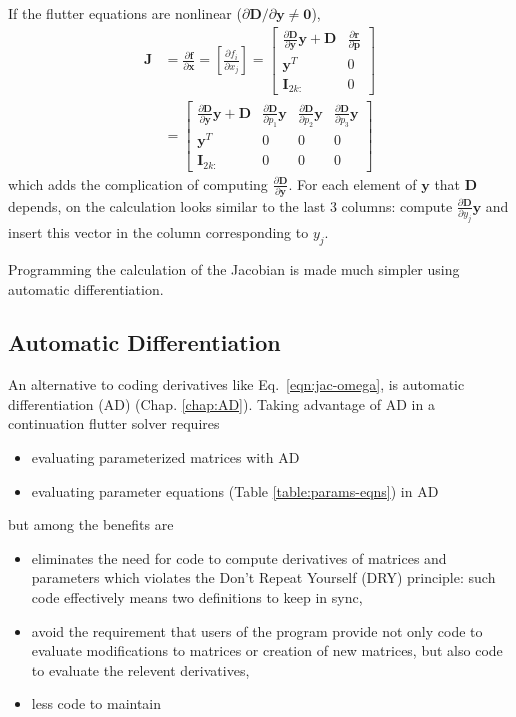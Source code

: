 \documentclass[10pt,openany,twoside]{book}
\numberwithin{equation}{section}   %
\newcommand{\Matrix}[1]{\boldsymbol{#1}}
\newcommand{\Vector}[1]{\boldsymbol{#1}}
\newcommand{\Chapref}[1]{Chap. \ref{#1}}
\newcommand{\Eqn}[1]{Eq.\ \ref{#1}}
\newcommand{\Tableref}[1]{Table \ref{#1}}
\begin{document}
If the flutter equations are nonlinear
($\partial \Matrix{D}/\partial \Vector{y} \ne \Vector{0}$),
\begin{align}
	\Matrix{J} &= \frac{\partial \Vector{f}}{\partial \Vector{x}} =
		\left[\frac{\partial f_i}{\partial x_j}\right]
		= \left[ \begin{array}{cc}
			\frac{\partial \Matrix{D}}{\partial \Vector{y}}\Vector{y}+\Matrix{D}
				& \frac{\partial \Vector{r}}{\partial \Vector{p}} \\
			\Vector{y}^T & 0 \\
			\Matrix{I}_{2k:} & 0
		\end{array}\right]		\nonumber \\
			&= \left[ \begin{array}{cccc}
				\frac{\partial \Matrix{D}}{\partial \Vector{y}}\Vector{y}+\Matrix{D}
					& \frac{\partial \Matrix{D}}{\partial p_1}\Vector{y}
					& \frac{\partial \Matrix{D}}{\partial p_2}\Vector{y}
					& \frac{\partial \Matrix{D}}{\partial p_3}\Vector{y}	\\
				\Vector{y}^T & 0 & 0 & 0	\\
				\Matrix{I}_{2k:} & 0 & 0 & 0
		\end{array}\right]
\end{align}
which adds the complication of computing $\frac{\partial \Matrix{D}}{\partial \Vector{y}}$.
For each element of $\Vector{y}$ that $\Matrix{D}$ depends, on the calculation looks
similar to the last 3 columns: compute $\frac{\partial \Matrix{D}}{\partial y_j}\Vector{y}$
and insert this vector in the column corresponding to $y_j$.

Programming the calculation of the Jacobian is made much simpler using
automatic differentiation.

\subsection{Automatic Differentiation}
An alternative to coding derivatives like \Eqn{eqn:jac-omega}, is
automatic differentiation (AD) (\Chapref{chap:AD}).
Taking advantage of AD in a continuation flutter solver requires
\begin{itemize}
	\item evaluating parameterized matrices with AD
	\item evaluating parameter equations (\Tableref{table:params-eqns}) in AD
\end{itemize}
but among the benefits are
\begin{itemize}
	\item eliminates the need for code to compute derivatives of matrices
		and parameters which violates the Don't Repeat Yourself (DRY) principle:
		such code effectively means two definitions to keep in sync,
	\item avoid the requirement that users of the program provide
		not only code to evaluate modifications to matrices or
		creation of new matrices, but also code to evaluate the
		relevent derivatives,
	\item less code to maintain
\end{itemize}
\end{document}
